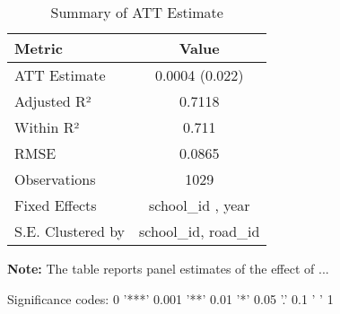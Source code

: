 \begin{table}[H]
\centering
\caption{Summary of ATT Estimate}
\label{tab:SA_hca_50p}
 \begin{center}
 \begin{tabular}{lc}
 \toprule
Metric & Value \\
\midrule
ATT Estimate & 0.0004 (0.022) \\
\hline 
 Adjusted R² & 0.7118 \\
Within R² & 0.711 \\
RMSE & 0.0865 \\
Observations & 1029 \\
\hline 
 Fixed Effects & school_id ,  year \\
S.E. Clustered by & school_id, road_id \\
\bottomrule
\end{tabular}
 \end{center}\begin{tablenotes}
\small
\item \textbf{Note:} The table reports panel estimates of the effect of ...
\item Significance codes: 0 '***' 0.001 '**' 0.01 '*' 0.05 '.' 0.1 ' ' 1
\end{tablenotes}
\end{table}